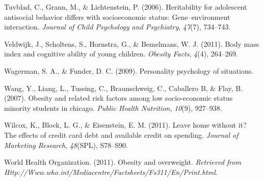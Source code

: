 \documentclass[man]{apa6}
\begin{document}
\leavevmode\hypertarget{ref-tuvblad2006heritability}{}%
Tuvblad, C., Grann, M., \& Lichtenstein, P. (2006). Heritability for adolescent antisocial behavior differs with socioeconomic status: Gene--environment interaction. \emph{Journal of Child Psychology and Psychiatry}, \emph{47}(7), 734--743.

\leavevmode\hypertarget{ref-veldwijk2011body}{}%
Veldwijk, J., Scholtens, S., Hornstra, G., \& Bemelmans, W. J. (2011). Body mass index and cognitive ability of young children. \emph{Obesity Facts}, \emph{4}(4), 264--269.

\leavevmode\hypertarget{ref-wagerman2009personality}{}%
Wagerman, S. A., \& Funder, D. C. (2009). Personality psychology of situations.

\leavevmode\hypertarget{ref-wang2007}{}%
Wang, Y., Liang, L., Tussing, C., Braunschweig, C., Caballero B, \& Flay, B. (2007). Obesity and related risk factors among low socio-economic status minority students in chicago. \emph{Public Health Nutrition}, \emph{10}(9), 927--938.

\leavevmode\hypertarget{ref-wilcox2011leave}{}%
Wilcox, K., Block, L. G., \& Eisenstein, E. M. (2011). Leave home without it? The effects of credit card debt and available credit on spending. \emph{Journal of Marketing Research}, \emph{48}(SPL), S78--S90.

\leavevmode\hypertarget{ref-who2011}{}%
World Health Organization. (2011). Obesity and overweight. \emph{Retrieved from Http://Www.who.int/Mediacentre/Factsheets/Fs311/En/Print.html}.

\endgroup
\end{document}
